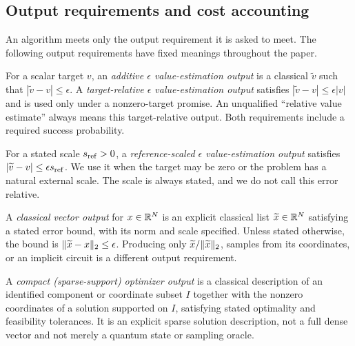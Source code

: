 \subsection{Output requirements and cost accounting}
\label{sec:prelim-output-contracts}

An algorithm meets only the output requirement it is asked to meet.  The
following output requirements have fixed meanings throughout the paper.

\begin{definition}
\label{def:value-output}
For a scalar target $v$, an \emph{additive $\epsilon$ value-estimation output}
is a classical $\widetilde v$ such that
$|\widetilde v-v|\leq\epsilon$.  A \emph{target-relative $\epsilon$
value-estimation output} satisfies
$|\widetilde v-v|\leq\epsilon|v|$ and is used only under a nonzero-target
promise.  An unqualified ``relative value estimate'' always means this
target-relative output.  Both requirements include a required success
probability.
\end{definition}

\begin{definition}
\label{def:reference-scaled-value-output}
For a stated scale $s_{\rm ref}>0$, a \emph{reference-scaled $\epsilon$
value-estimation output} satisfies
$|\widetilde v-v|\leq\epsilon s_{\rm ref}$.  We use it when the target may be
zero or the problem has a natural external scale.  The scale is always stated,
and we do not call this error relative.
\end{definition}

\begin{definition}
\label{def:classical-vector-output}
A \emph{classical vector output} for $x\in\mathbb{R}^N$ is an explicit classical list
$\widetilde x\in\mathbb{R}^N$ satisfying a stated error bound, with its norm and
scale specified.  Unless stated otherwise, the bound is
$\lVert\widetilde x-x\rVert_2\leq\epsilon$.  Producing only
$\widetilde x/\lVert\widetilde x\rVert_2$, samples from its coordinates, or an
implicit circuit is a different output requirement.
\end{definition}

\begin{definition}
\label{def:compact-optimizer-output}
A \emph{compact (sparse-support) optimizer output} is a classical description
of an identified component or coordinate subset $I$ together with the nonzero
coordinates of a solution supported on $I$, satisfying stated optimality and
feasibility tolerances.  It is an explicit sparse solution description, not a
full dense vector and not merely a quantum state or sampling oracle.
\end{definition}

